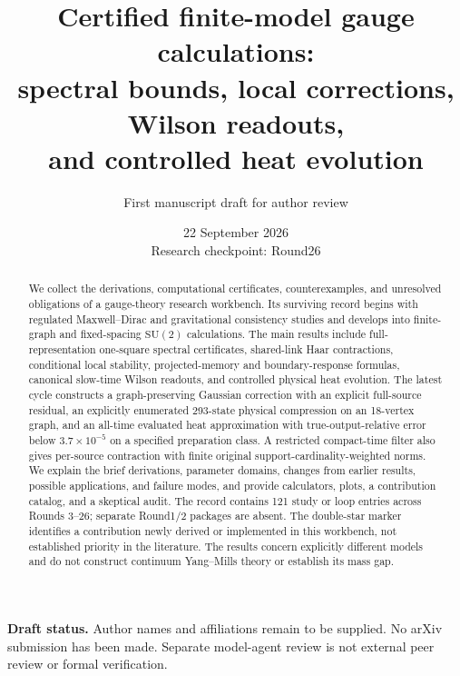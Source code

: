 \documentclass[11pt,a4paper]{article}
\title{Certified finite-model gauge calculations:\\spectral bounds, local corrections, Wilson readouts,\\and controlled heat evolution}
\author{First manuscript draft for author review}
\date{22 September 2026\\\small Research checkpoint: Round26}
\theoremstyle{definition}\newtheorem{definition}[theorem]{Definition}
\theoremstyle{remark}\newtheorem{remark}[theorem]{Remark}
\begin{document}
\maketitle
\begin{abstract}
We collect the derivations, computational certificates, counterexamples, and unresolved obligations of a gauge-theory research workbench. Its surviving record begins with regulated Maxwell--Dirac and gravitational consistency studies and develops into finite-graph and fixed-spacing $\mathrm{SU}(2)$ calculations. The main results include full-representation one-square spectral certificates, shared-link Haar contractions, conditional local stability, projected-memory and boundary-response formulas, canonical slow-time Wilson readouts, and controlled physical heat evolution. The latest cycle constructs a graph-preserving Gaussian correction with an explicit full-source residual, an explicitly enumerated 293-state physical compression on an 18-vertex graph, and an all-time evaluated heat approximation with true-output-relative error below $3.7\times10^{-5}$ on a specified preparation class. A restricted compact-time filter also gives per-source contraction with finite original support-cardinality-weighted norms. We explain the brief derivations, parameter domains, changes from earlier results, possible applications, and failure modes, and provide calculators, plots, a contribution catalog, and a skeptical audit. The record contains 121 study or loop entries across Rounds 3--26; separate Round1/2 packages are absent. The double-star marker identifies a contribution newly derived or implemented in this workbench, not established priority in the literature. The results concern explicitly different models and do not construct continuum Yang--Mills theory or establish its mass gap.
\end{abstract}
\vspace{3pt}
\begin{center}\small\textbf{Draft status.} Author names and affiliations remain to be supplied. No arXiv submission has been made. Separate model-agent review is not external peer review or formal verification.\end{center}
\clearpage
\tableofcontents
\clearpage








\clearpage


\clearpage
\appendix



\end{document}
